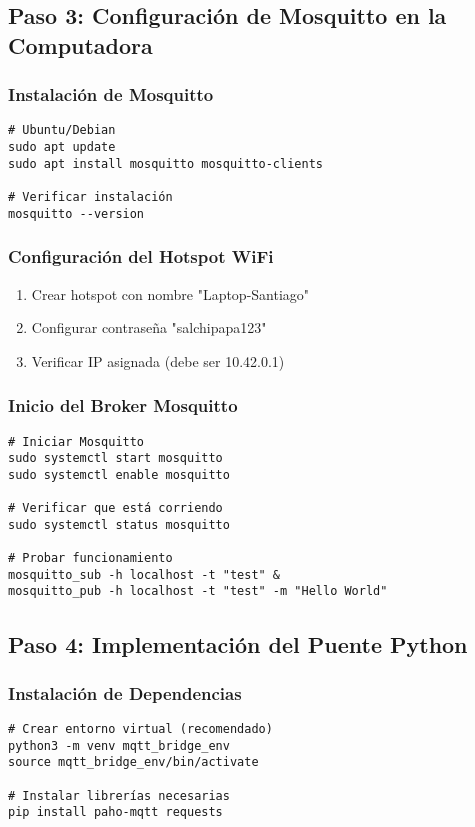 \documentclass[12pt]{article}
\begin{document}
\subsection{Paso 3: Configuración de Mosquitto en la Computadora}

\subsubsection{Instalación de Mosquitto}
\begin{verbatim}
# Ubuntu/Debian
sudo apt update
sudo apt install mosquitto mosquitto-clients

# Verificar instalación
mosquitto --version
\end{verbatim}

\subsubsection{Configuración del Hotspot WiFi}
\begin{enumerate}
    \item Crear hotspot con nombre "Laptop-Santiago"
    \item Configurar contraseña "salchipapa123"
    \item Verificar IP asignada (debe ser 10.42.0.1)
\end{enumerate}

\subsubsection{Inicio del Broker Mosquitto}
\begin{verbatim}
# Iniciar Mosquitto
sudo systemctl start mosquitto
sudo systemctl enable mosquitto

# Verificar que está corriendo
sudo systemctl status mosquitto

# Probar funcionamiento
mosquitto_sub -h localhost -t "test" &
mosquitto_pub -h localhost -t "test" -m "Hello World"
\end{verbatim}

\subsection{Paso 4: Implementación del Puente Python}

\subsubsection{Instalación de Dependencias}
\begin{verbatim}
# Crear entorno virtual (recomendado)
python3 -m venv mqtt_bridge_env
source mqtt_bridge_env/bin/activate

# Instalar librerías necesarias
pip install paho-mqtt requests
\end{verbatim}
\end{document}
